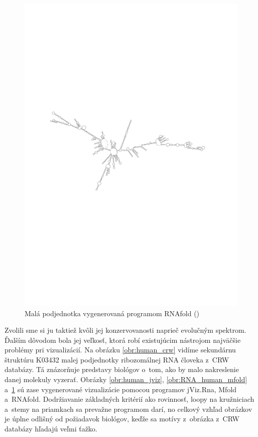\begin{figure}
  \centering
  \includegraphics[clip, trim=2.5cm 10cm 3cm 10cm, angle=90, width=1\textwidth]{../img/human_RNAfold}
  \caption{Malá podjednotka vygenerovaná programom RNAfold (\citet{VIENNA_RNA})}
  \label{obr:RNA_human_rnafold}
\end{figure}

Zvolili sme si ju taktiež kvôli jej konzervovanosti naprieč evolučným spektrom. Ďalším
dôvodom bola jej veľkosť, ktorá robí existujúcim nástrojom najväčšie problémy
pri vizualizácií. Na obrázku \ref{obr:human_crw} vidíme sekundárnu štruktúru 
K03432 malej podjednotky ribozomálnej RNA človeka z~CRW databázy.
Tá znázorňuje predstavy biológov o~tom, ako by malo nakreslenie danej molekuly vyzerať.
Obrázky \ref{obr:human_jviz}, \ref{obr:RNA_human_mfold} a~\ref{obr:RNA_human_rnafold}
sú zase vygenerované vizualizácie pomocou programov jViz.Rna, Mfold a~RNAfold.
Dodržiavanie základných kritérií ako rovinnosť, loopy na kružniciach a~stemy na priamkach
sa prevažne programom darí, no celkový vzhľad obrázkov je úplne odlišný od požiadavok
biológov, keďže sa motívy z~obrázka z~CRW databázy hľadajú veľmi ťažko.

